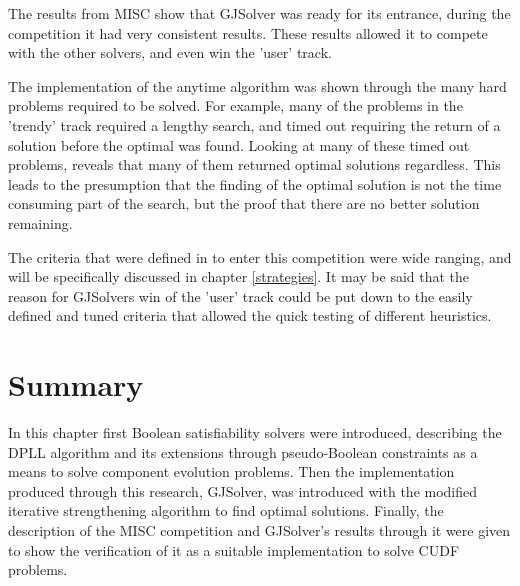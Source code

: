 The results from MISC show that GJSolver was ready for its entrance, during the competition it had very consistent results.
These results allowed it to compete with the other solvers, and even win the 'user' track.

The implementation of the anytime algorithm was shown through the many hard problems required to be solved.
For example, many of the problems in the 'trendy' track required a lengthy search, and timed out requiring the return of a solution before the optimal was found.
Looking at many of these timed out problems, reveals that many of them returned optimal solutions regardless.
This leads to the presumption that the finding of the optimal solution is not the time consuming part of the search, but the proof that there are no better solution remaining.

The criteria that were defined in to enter this competition were wide ranging, and will be specifically discussed in chapter \ref{strategies}.
It may be said that the reason for GJSolvers win of the 'user' track could be put down to the easily defined and tuned criteria that allowed the quick testing of different heuristics.




\section{Summary}
In this chapter first Boolean satisfiability solvers were introduced, 
describing the DPLL algorithm and its extensions through pseudo-Boolean constraints as a means to solve component evolution problems.
Then the implementation produced through this research, GJSolver, was introduced with the modified iterative strengthening algorithm to find optimal solutions.
Finally, the description of the MISC competition and GJSolver's results through it were given to show the verification of it as a suitable implementation to solve CUDF problems.
